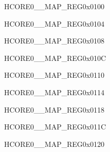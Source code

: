 \begin{register}{H}{CORE0\_\_MAP\_REG}{0x0100}\label{regdesc:CORE0AXIPDMAINCH2INTMAPREG}
\end{register}\vspace{-3em}


\begin{register}{H}{CORE0\_\_MAP\_REG}{0x0104}\label{regdesc:CORE0AXIPDMAOUTCH0INTMAPREG}
\end{register}\vspace{-3em}


\begin{register}{H}{CORE0\_\_MAP\_REG}{0x0108}\label{regdesc:CORE0AXIPDMAOUTCH1INTMAPREG}
\end{register}\vspace{-3em}


\begin{register}{H}{CORE0\_\_MAP\_REG}{0x010C}\label{regdesc:CORE0AXIPDMAOUTCH2INTMAPREG}
\end{register}\vspace{-3em}


\begin{register}{H}{CORE0\_\_MAP\_REG}{0x0110}\label{regdesc:CORE0RSAINTMAPREG}
\end{register}\vspace{-3em}


\begin{register}{H}{CORE0\_\_MAP\_REG}{0x0114}\label{regdesc:CORE0AESINTMAPREG}
\end{register}\vspace{-3em}


\begin{register}{H}{CORE0\_\_MAP\_REG}{0x0118}\label{regdesc:CORE0SHAINTMAPREG}
\end{register}\vspace{-3em}


\begin{register}{H}{CORE0\_\_MAP\_REG}{0x011C}\label{regdesc:CORE0ECCINTMAPREG}
\end{register}\vspace{-3em}


\begin{register}{H}{CORE0\_\_MAP\_REG}{0x0120}\label{regdesc:CORE0ECDSAINTMAPREG}
\end{register}\vspace{-3em}

